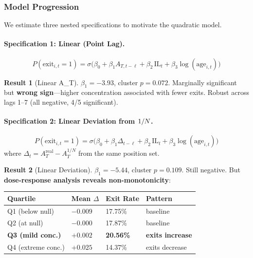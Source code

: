 \subsubsection{Model Progression}

We estimate three nested specifications to motivate the quadratic model.

\paragraph{Specification 1: Linear (Point Lag).}
\begin{equation}\label{eq:spec-linear-point}
  P(\text{exit}_{i,t} = 1) = \sigma\bigl(
    \beta_0 + \beta_1 A_{T,t-\ell} + \beta_2 \,\text{IL}_t
    + \beta_3 \log(\text{age}_{i,t})
  \bigr)
\end{equation}

\textbf{Result 1} (Linear A\_T). $\beta_1 = -3.93$, cluster $p = 0.072$.
Marginally significant but \textbf{wrong sign}---higher concentration
associated with fewer exits. Robust across lags 1--7 (all negative, 4/5
significant).

\paragraph{Specification 2: Linear Deviation from $1/N$.}
\begin{equation}\label{eq:spec-linear-dev}
  P(\text{exit}_{i,t} = 1) = \sigma\bigl(
    \beta_0 + \beta_1 \Delta_{t-\ell} + \beta_2 \,\text{IL}_t
    + \beta_3 \log(\text{age}_{i,t})
  \bigr)
\end{equation}
where $\Delta_t = A_T^{\text{real}} - A_T^{1/N}$ from the same position set.

\textbf{Result 2} (Linear Deviation). $\beta_1 = -5.44$, cluster $p = 0.109$.
Still negative. But \textbf{dose-response analysis reveals non-monotonicity}:

\begin{center}
\begin{tabular}{@{}llll@{}}
\toprule
Quartile & Mean $\Delta$ & Exit Rate & Pattern \\
\midrule
Q1 (below null) & $-0.009$ & 17.75\% & baseline \\
Q2 (at null) & $-0.000$ & 17.87\% & baseline \\
\textbf{Q3 (mild conc.)} & $\mathbf{+0.002}$ & \textbf{20.56\%} & \textbf{exits increase} \\
Q4 (extreme conc.) & $+0.025$ & 14.37\% & exits decrease \\
\bottomrule
\end{tabular}
\end{center}

